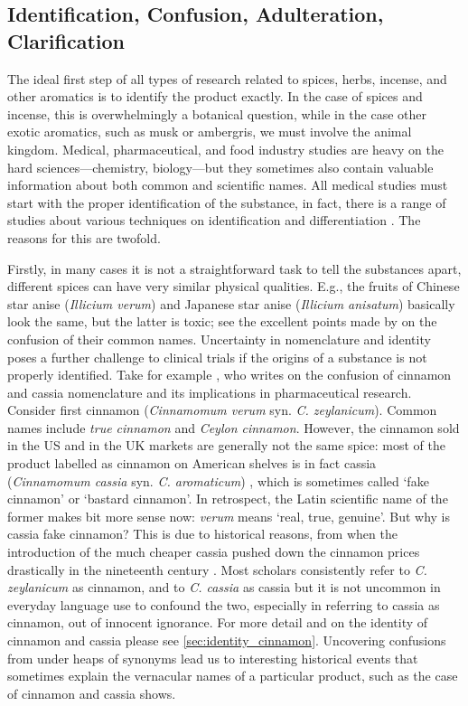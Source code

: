 \subsection{Identification, Confusion, Adulteration, Clarification}

The ideal first step of all types of research related to spices, herbs, incense, and other aromatics is to identify the product exactly. In the case of spices and incense, this is overwhelmingly a botanical question, while in the case other exotic aromatics, such as musk or ambergris, we must involve the animal kingdom. Medical, pharmaceutical, and food industry studies are heavy on the hard sciences---chemistry, biology---but they sometimes also contain valuable information about both common and scientific names. All medical studies must start with the proper identification of the substance, in fact, there is a range of studies about various techniques on identification and differentiation \autocite[cf.][]{ford_cinnamon_2019}. The reasons for this are twofold. 

Firstly, in many cases it is not a straightforward task to tell the substances apart, different spices can have very similar physical qualities. E.g., the fruits of Chinese star anise (\textit{Illicium verum}) and Japanese star anise (\textit{Illicium anisatum}) basically look the same, but the latter is toxic; see the excellent points made by \textcite{small_confusion_1996} on the confusion of their common names. Uncertainty in nomenclature and identity poses a further challenge to clinical trials if the origins of a substance is not properly identified. Take for example \textcite{oketch-rabah_cinnamon_2018}, who writes on the confusion of cinnamon and cassia nomenclature and its implications in pharmaceutical research. Consider first cinnamon (\textit{Cinnamomum verum} syn. \textit{C. zeylanicum}). Common names include \textit{true cinnamon} and \textit{Ceylon cinnamon}. However, the cinnamon sold in the US and in the UK markets are generally not the same spice: most of the product labelled as cinnamon on American shelves is in fact cassia (\textit{Cinnamomum cassia} syn. \textit{C. aromaticum}) \autocite{oketch-rabah_cinnamon_2018}, which is sometimes called `fake cinnamon' or `bastard cinnamon'. In retrospect, the Latin scientific name of the former makes bit more sense now: \textit{verum} means `real, true, genuine'. But why is cassia fake cinnamon? This is due to historical reasons, from when the introduction of the much cheaper cassia pushed down the cinnamon prices drastically in the nineteenth century \autocite{wijesekera_chemistry_1978}. Most scholars consistently refer to \textit{C. zeylanicum} as cinnamon, and to \textit{C. cassia} as cassia but it is not uncommon in everyday language use to confound the two, especially in referring to cassia as cinnamon, out of innocent ignorance. For more detail and on the identity of cinnamon and cassia please see \cref{sec:identity_cinnamon}. Uncovering confusions from under heaps of synonyms lead us to interesting historical events that sometimes explain the vernacular names of a particular product, such as the case of cinnamon and cassia shows. 

